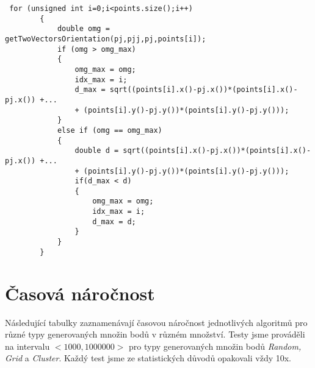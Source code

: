\documentclass{article}
\begin{document}
\begin{lstlisting}
 for (unsigned int i=0;i<points.size();i++)
        {
            double omg = getTwoVectorsOrientation(pj,pjj,pj,points[i]);
            if (omg > omg_max)
            {
                omg_max = omg;
                idx_max = i;
                d_max = sqrt((points[i].x()-pj.x())*(points[i].x()-pj.x()) +...
                + (points[i].y()-pj.y())*(points[i].y()-pj.y()));
            }
            else if (omg == omg_max)
            {
                double d = sqrt((points[i].x()-pj.x())*(points[i].x()-pj.x()) +...
                + (points[i].y()-pj.y())*(points[i].y()-pj.y()));
                if(d_max < d)
                {
                    omg_max = omg;
                    idx_max = i;
                    d_max = d;
                }
            }
        }
\end{lstlisting}
%
\section{Časová náročnost}
Následující tabulky zaznamenávají časovou náročnost jednotlivých algoritmů pro různé typy generovaných množin bodů v různém množství. Testy jsme prováděli na intervalu  $ <1000,1000000>$ pro typy generovaných množin bodů \emph{Random, Grid} a \emph{Cluster}. Každý test jsme ze statistických důvodů opakovali vždy 10x.\\
\end{document}
